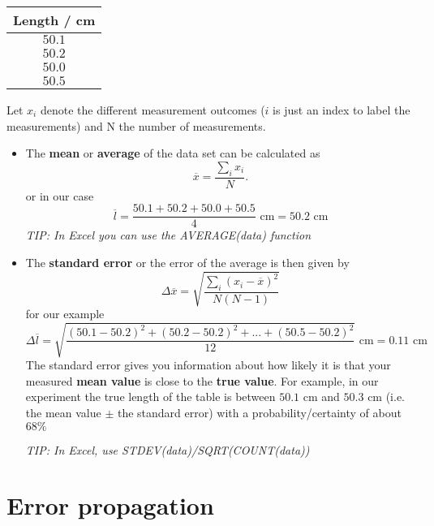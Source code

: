 \documentclass[a4paper,10pt]{article}
\begin{document}
\begin{center}
\begin{tabular}{|c|}
 \hline
 Length / cm \\
 \hline
 $50.1$  \\ 
 $50.2$  \\ 
 $50.0$  \\ 
 $50.5$  \\
 \hline
 
\end{tabular}
\end{center}
Let $x_i$ denote the different measurement outcomes ($i$ is just an index to label the measurements) and N the number of measurements.  
\begin{itemize} 
 \item The \textbf{mean} or \textbf{average} of the data set can be calculated as 
 \[ 
  \overline{x} = \frac{\sum_i x_i}{ N}.
 \]
 or in our case
 \[
   \overline{l} = \frac{50.1+50.2+50.0+50.5}{4} \text{ cm} = 50.2 \text{ cm}
 \]
 \textit{TIP: In Excel you can use the AVERAGE(data) function}
 \item The \textbf{standard error} or the error of the average is then given by
 \[
  \Delta \overline{x} = \sqrt{ \frac{\sum_i (x_i - \overline{x})^2}{N(N-1)}}
 \]
 for our example
 \[
  \Delta \overline{l} = \sqrt{\frac{(50.1-50.2)^2 + (50.2 - 50.2)^2 + ... + (50.5-50.2)^2}{12}} \text{ cm} = 0.11 \text{ cm}
 \]
 The standard error gives you information about how likely it is that your measured \textbf{mean value} is close to the \textbf{true value}. 
 For example, in our experiment the true length of the table is between $50.1$ cm and $50.3$ cm (i.e. the mean value $\pm$ the standard error)
 with a probability/certainty of about $68 \%$

 \textit{TIP: In Excel, use STDEV(data)/SQRT(COUNT(data))}
\end{itemize}

\section{Error propagation}
\end{document}
